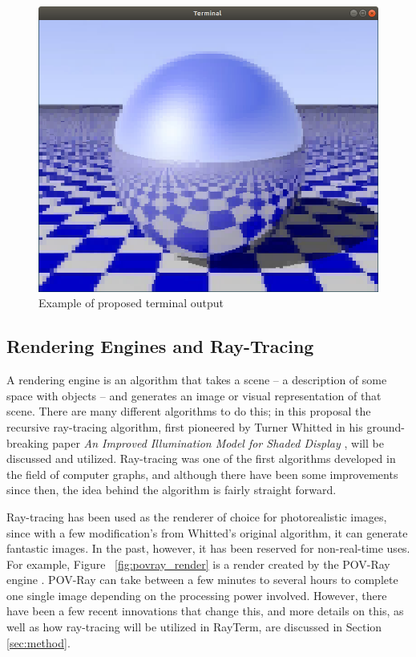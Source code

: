 \documentclass[11pt]{article}
\newcommand{\name}{{\sc RayTerm}}
\begin{document}
\begin{figure}[htb]
  \centering
  \includegraphics[width=\textwidth]{resources/checker_metal}
  \caption{Example of proposed terminal output}
  \label{fig:checker_metal}
\end{figure}

\subsection{Rendering Engines and Ray-Tracing}
\label{sec:introduction:raytracing}

A rendering engine is an algorithm that takes a scene -- a description of some space with objects -- and generates an image or visual representation of that scene.
There are many different algorithms to do this; in this proposal the recursive ray-tracing algorithm, first pioneered by Turner Whitted in his ground-breaking paper {\it An Improved Illumination Model for Shaded Display} \cite{whitted1980improved}, will be discussed and utilized.
Ray-tracing was one of the first algorithms developed in the field of computer graphs, and although there have been some improvements since then, the idea behind the algorithm is fairly straight forward.

Ray-tracing has been used as the renderer of choice for photorealistic images, since with a few modification's from Whitted's original algorithm, it can generate fantastic images.
In the past, however, it has been reserved for non-real-time uses.
For example, Figure ~\ref{fig:povray_render} is a render created by the POV-Ray engine \cite{povray}.
POV-Ray can take between a few minutes to several hours to complete one single image depending on the processing power involved.
However, there have been a few recent innovations that change this, and more details on this, as well as how ray-tracing will be utilized in \name, are discussed in Section \ref{sec:method}.
\end{document}

